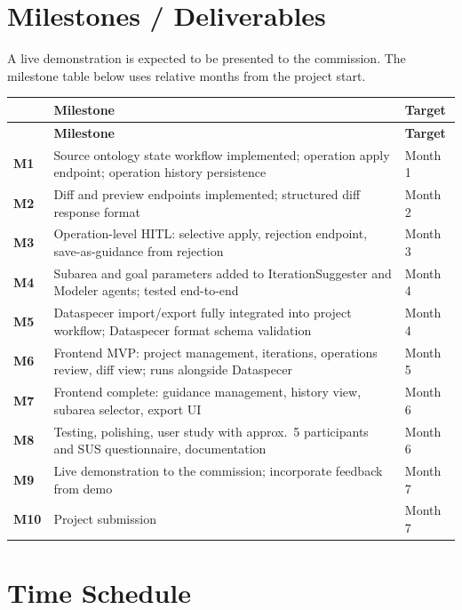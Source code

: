 \documentclass{article}
\begin{document}
\section{Milestones / Deliverables}

A live demonstration is expected to be presented to the commission. The milestone table below uses relative months from the project start.

\begin{longtable}{|l|p{10cm}|l|}
\hline
 & \textbf{Milestone} & \textbf{Target} \\
\hline
\endfirsthead
\hline
 & \textbf{Milestone} & \textbf{Target} \\
\hline
\endhead
\textbf{M1} & Source ontology state workflow implemented; operation apply endpoint; operation history persistence & Month 1 \\
\hline
\textbf{M2} & Diff and preview endpoints implemented; structured diff response format & Month 2 \\
\hline
\textbf{M3} & Operation-level HITL: selective apply, rejection endpoint, save-as-guidance from rejection & Month 3 \\
\hline
\textbf{M4} & Subarea and goal parameters added to IterationSuggester and Modeler agents; tested end-to-end & Month 4 \\
\hline
\textbf{M5} & Dataspecer import/export fully integrated into project workflow; Dataspecer format schema validation & Month 4 \\
\hline
\textbf{M6} & Frontend MVP: project management, iterations, operations review, diff view; runs alongside Dataspecer & Month 5 \\
\hline
\textbf{M7} & Frontend complete: guidance management, history view, subarea selector, export UI & Month 6 \\
\hline
\textbf{M8} & Testing, polishing, user study with approx.\ 5 participants and SUS questionnaire, documentation & Month 6 \\
\hline
\textbf{M9} & Live demonstration to the commission; incorporate feedback from demo & Month 7 \\
\hline
\textbf{M10} & Project submission & Month 7 \\
\hline
\end{longtable}

\clearpage
\section{Time Schedule}
\end{document}
